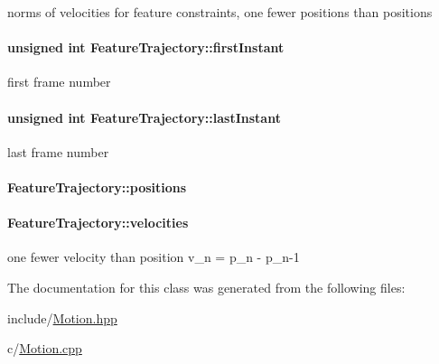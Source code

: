norms of velocities for feature constraints, one fewer positions than positions 

\hypertarget{classFeatureTrajectory_a2a6edaac8722d353f8168e4149333761}{
\paragraph[{first\-Instant}]{\setlength{\rightskip}{0pt plus 5cm}unsigned int Feature\-Trajectory\-::first\-Instant\hspace{0.3cm}{\ttfamily [protected]}}}\label{classFeatureTrajectory_a2a6edaac8722d353f8168e4149333761}


first frame number 

\hypertarget{classFeatureTrajectory_a3d6bc8bd9e02f2d56deb60f6fb22a36b}{
\paragraph[{last\-Instant}]{\setlength{\rightskip}{0pt plus 5cm}unsigned int Feature\-Trajectory\-::last\-Instant\hspace{0.3cm}{\ttfamily [protected]}}}\label{classFeatureTrajectory_a3d6bc8bd9e02f2d56deb60f6fb22a36b}


last frame number 

\hypertarget{classFeatureTrajectory_a1ae33a4db55f46436c1f40603fb74f77}{
\paragraph[{positions}]{ Feature\-Trajectory\-::positions\hspace{0.3cm}{\ttfamily [protected]}}}\label{classFeatureTrajectory_a1ae33a4db55f46436c1f40603fb74f77}
\hypertarget{classFeatureTrajectory_a0aaf4f9bc0b82f6837abe1c5b8e74b50}{
\paragraph[{velocities}]{ Feature\-Trajectory\-::velocities\hspace{0.3cm}{\ttfamily [protected]}}}\label{classFeatureTrajectory_a0aaf4f9bc0b82f6837abe1c5b8e74b50}
one fewer velocity than position v\-\_\-n = p\-\_\-n -\/ p\-\_\-n-\/1 

The documentation for this class was generated from the following files\-:\begin{DoxyCompactItemize}
\item 
include/\hyperlink{Motion_8hpp}{Motion.\-hpp}\item 
c/\hyperlink{Motion_8cpp}{Motion.\-cpp}\end{DoxyCompactItemize}
